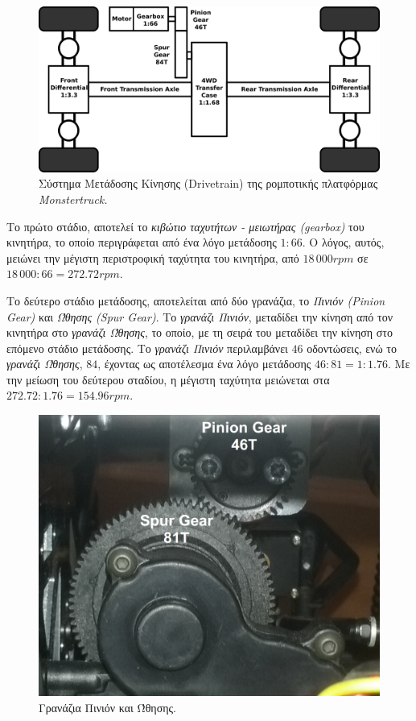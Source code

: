 \bigskip
\begin{figure}[!ht]
	\centering
	\includegraphics[width=0.8\linewidth]{Chapters/Chapter2/Figures/drivetrain.png}
	\caption{Σύστημα Μετάδοσης Κίνησης (Drivetrain) της ρομποτικής πλατφόρμας \textit{Monstertruck.}}
	\label{fig:drivetrain}
\end{figure}

\bigskip
Το πρώτο στάδιο, αποτελεί το \textit{κιβώτιο ταχυτήτων - μειωτήρας (gearbox)} του κινητήρα, το οποίο περιγράφεται από ένα λόγο μετάδοσης $1:66$. Ο λόγος, αυτός, μειώνει την μέγιστη περιστροφική ταχύτητα του κινητήρα, από $18\,000rpm$ σε $18\,000:66=272.72rpm$.

\bigskip
Το δεύτερο στάδιο μετάδοσης, αποτελείται από δύο γρανάζια, το \textit{Πινιόν (Pinion Gear)} και \textit{Ώθησης (Spur Gear)}. Το \textit{γρανάζι Πινιόν}, μεταδίδει την κίνηση από τον κινητήρα στο \textit{γρανάζι Ώθησης}, το οποίο, με τη σειρά του μεταδίδει την κίνηση στο επόμενο στάδιο μετάδοσης. Το \textit{γρανάζι Πινιόν} περιλαμβάνει $46$ οδοντώσεις, ενώ το \textit{γρανάζι Ώθησης}, $84$, έχοντας ως αποτέλεσμα ένα λόγο μετάδοσης $46:81=1:1.76$. Με την μείωση του δεύτερου σταδίου, η μέγιστη ταχύτητα μειώνεται στα $272.72:1.76 = 154.96rpm$.

\begin{figure}[!ht]
	\centering
	\includegraphics[width=0.4\linewidth]{Chapters/Chapter2/Figures/spur_and_pinion_gears.png}
	\caption{Γρανάζια Πινιόν και Ώθησης.}
	\label{fig:spur_pinion_gears}
\end{figure}

